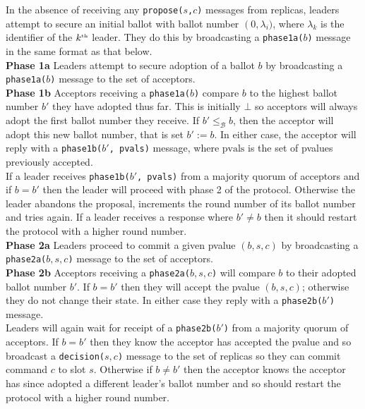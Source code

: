 In the absence of receiving any \texttt{propose($s$,$c$)} messages from replicas, leaders attempt to secure an initial ballot with ballot number $\left(0, \lambda_i)$, where $\lambda_k$ is the identifier of the $k^{\text{\tiny th}}$ leader. They do this by broadcasting a \texttt{phase1a($b$)} message in the same format as that below. \\

\textbf{Phase 1a} Leaders attempt to secure adoption of a ballot $b$ by broadcasting a \texttt{phase1a($b$)} message to the set of acceptors. \\

\textbf{Phase 1b} Acceptors receiving a \texttt{phase1a($b$)} compare $b$ to the highest ballot number $b'$ they have adopted thus far. This is initially $\bot$ so acceptors will always adopt the first ballot number they receive. If $b' \leq_\mathcal{B} b$, then the acceptor will adopt this new ballot number, that is set $b' := b$. In either case, the acceptor will reply with a \texttt{phase1b($b'$, pvals)} message, where $\textrm{pvals}$ is the set of pvalues previously accepted. \\

If a leader receives \texttt{phase1b($b'$, pvals)} from a majority quorum of acceptors and if $b = b'$ then the leader will proceed with phase 2 of the protocol. Otherwise the leader abandons the proposal, increments the round number of its ballot number and tries again. If a leader receives a response where $b' \neq b$ then it should restart the protocol with a higher round number. \\

\textbf{Phase 2a} Leaders proceed to commit a given pvalue $\left( b, s, c \right)$ by broadcasting a \texttt{phase2a($b,s,c$)} message to the set of acceptors. \\

\textbf{Phase 2b} Acceptors receiving a \texttt{phase2a($b,s,c$)} will compare $b$ to their adopted ballot number $b'$. If $b = b'$ then they will accept the pvalue $(b,s,c)$; otherwise they do not change their state. In either case they reply with a  \texttt{phase2b($b'$)} message. \\

Leaders will again wait for receipt of a \texttt{phase2b($b'$)} from a majority quorum of acceptors. If $b = b'$ then they know the acceptor has accepted the pvalue and so broadcast a \texttt{decision($s,c$)} message to the set of replicas so they can commit command $c$ to slot $s$. Otherwise if $b \neq b'$ then the acceptor knows the acceptor has since adopted a different leader's ballot number and so should restart the protocol with a higher round number. \\
 

